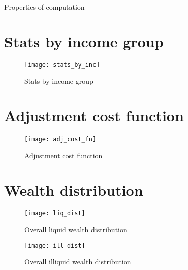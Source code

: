 \documentclass[english]{article}
\begin{document}


\begin{table}[H]
	\centering
	\caption{Properties of computation}
	
\end{table}

\section{Stats by income group}

\begin{multicols}{2}

\begin{figure}[H]
\protect\caption{Stats by income group}
\centering{}
\texttt{[image: stats\_by\_inc]}
\end{figure}

\end{multicols}
\newpage
\section{Adjustment cost function}

\begin{figure}[H]
\protect\caption{Adjustment cost function}
\centering{}
\texttt{[image: adj\_cost\_fn]}
\end{figure}


\newpage
\section{Wealth distribution}


\begin{figure}[H]
\protect\caption{Overall liquid wealth distribution}
\centering{}
\texttt{[image: liq\_dist]}
\end{figure}

\begin{figure}[H]
\protect\caption{Overall illiquid wealth distribution}
\centering{}
\texttt{[image: ill\_dist]}
\end{figure}
\end{document}
